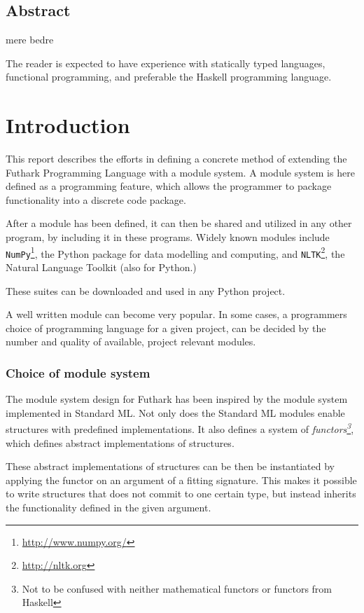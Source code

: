 \subsection*{Abstract}
\label{subsec:abstract}
mere bedre

The reader is expected to have experience with statically typed languages,
functional programming, and preferable the Haskell programming language.
\section{Introduction}
\label{sec:introduction}
This report describes the efforts in defining a concrete method of extending the Futhark Programming Language
with a module system.
A module system is here defined as a programming feature,
which allows the programmer to package functionality into a discrete code
package.

After a module has been defined, it can then be shared and utilized in any other
program, by including it in these programs. Widely known modules include
\texttt{NumPy}\footnote{\url{http://www.numpy.org/}}, the Python package for
data modelling and computing, and \texttt{NLTK}\footnote{\url{http://nltk.org}},
the Natural Language Toolkit (also for Python.)

These suites can be downloaded and used in any Python project.

A well written module can become very popular. In some cases, a programmers
choice of programming language for a given project, can be decided by the number and quality of
available, project relevant modules.

\subsubsection{Choice of module system}
The module system design for Futhark has been inspired by the module system
implemented in Standard ML\cite{crash_course}. Not only does the Standard ML
modules enable structures with predefined implementations.
It also defines a system of \textit{functors\footnote{Not to be confused with neither mathematical
  functors or functors from Haskell}}, which defines abstract implementations of
structures.

These abstract implementations of structures can be then be instantiated by
applying the functor on an argument of a fitting signature.
This makes it
possible to write structures that does not commit to one certain type, but
instead inherits the functionality defined in the given argument.

